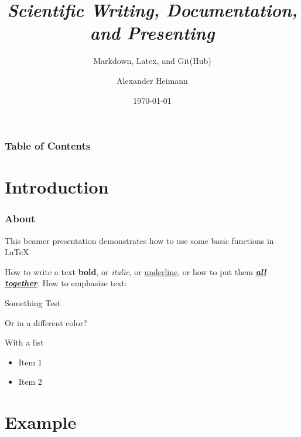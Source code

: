 \documentclass[aspectratio=169]{beamer}
\title[Template]{\emph{Scientific Writing, Documentation, and Presenting}}
\subtitle[]{Markdown, Latex, and Git(Hub)}
\author[Alexander Heimann]{Alexander Heimann}
\institute[]{NCKU - Department of Geomatics}
\date[\today]{\today}
\begin{document}
\frame{\titlepage}      %

\begin{frame}           %
    \frametitle{Table of Contents}
    \tableofcontents
\end{frame}


\section{Introduction}

\begin{frame}
    \frametitle{About}
    This beamer presentation demonstrates how to use some basic functions in \LaTeX

    How to write a text \textbf{bold}, or \textit{italic}, or \underline{underline}, or how to put them \textbf{\textit{\underline{all together}}}.
    How to emphasize text:
    \begin{block}{Something}
        Test
    \end{block}
    Or in a different color?\\
    \begin{alertblock}{With a list}
        \begin{itemize}
            \item Item 1
            \item Item 2
        \end{itemize}
    \end{alertblock}
\end{frame}

\section{Example}
\end{document}
